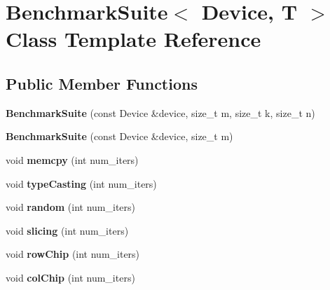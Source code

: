 \hypertarget{class_benchmark_suite}{}\section{Benchmark\+Suite$<$ Device, T $>$ Class Template Reference}
\label{class_benchmark_suite}
\subsection*{Public Member Functions}
\begin{DoxyCompactItemize}
\item 
\mbox{\label{class_benchmark_suite_a6b9ee7ab131d23fc111d346c5a3c5f02}} 
{\bfseries Benchmark\+Suite} (const Device \&device, size\+\_\+t m, size\+\_\+t k, size\+\_\+t n)
\item 
\mbox{\label{class_benchmark_suite_a9f1263956e5c66e5ecb5aad3f8c8d86b}} 
{\bfseries Benchmark\+Suite} (const Device \&device, size\+\_\+t m)
\item 
\mbox{\label{class_benchmark_suite_a71e21f4a518dec18f7b61fe1f90cf4ce}} 
void {\bfseries memcpy} (int num\+\_\+iters)
\item 
\mbox{\label{class_benchmark_suite_a0789df8b43b1868fc69286063663e313}} 
void {\bfseries type\+Casting} (int num\+\_\+iters)
\item 
\mbox{\label{class_benchmark_suite_ac0fcdc53056b4b4d05aa32c42e18a555}} 
void {\bfseries random} (int num\+\_\+iters)
\item 
\mbox{\label{class_benchmark_suite_a49b8182ae4f802fa8f095ab70a9cba4b}} 
void {\bfseries slicing} (int num\+\_\+iters)
\item 
\mbox{\label{class_benchmark_suite_a313a846461859242eabf7eb4522e6bd8}} 
void {\bfseries row\+Chip} (int num\+\_\+iters)
\item 
\mbox{\label{class_benchmark_suite_acfde6aa82a61fafbc7fc4fc28057e709}} 
void {\bfseries col\+Chip} (int num\+\_\+iters)
\item 

\end{DoxyCompactItemize}
